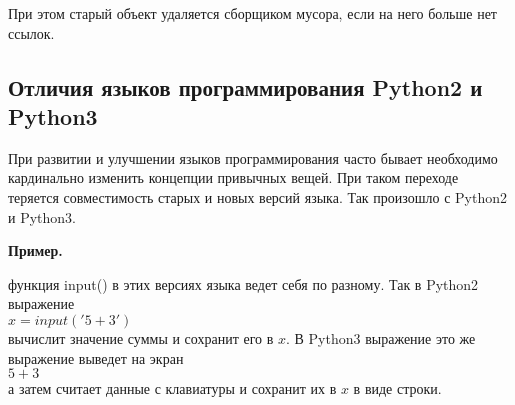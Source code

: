 \documentclass[a4paper, fleqn]{article}
\newenvironment{example}[1][]{\medskip \noindent \textbf{Пример. #1}\par \nopagebreak}{\medskip \par} %
\begin{document}
		При этом старый объект удаляется сборщиком мусора, если на него больше нет ссылок.
		
	\subsection*{Отличия языков программирования Python2 и Python3}
	
		При развитии и улучшении языков программирования часто бывает необходимо кардинально изменить концепции привычных вещей. При таком переходе теряется совместимость старых и новых версий языка. Так произошло с Python2 и Python3. 
		
		\begin{example}
			
			функция input() в этих версиях языка ведет себя по разному. Так в Python2 выражение\\
			$x = input('5 + 3')$\\
			вычислит значение суммы и сохранит его в $x$.
			В Python3 выражение это же выражение выведет на экран\\
			$5 + 3$\\
			а затем считает данные с клавиатуры и сохранит их в $x$ в виде строки.
			
		\end{example}
		
\end{document}
